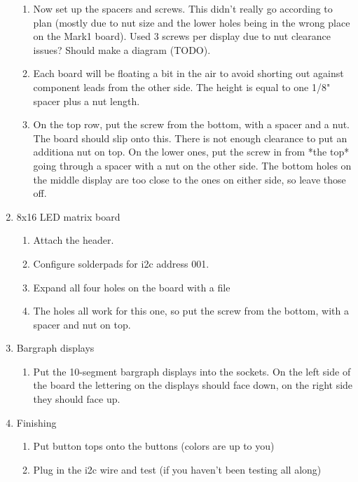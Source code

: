 \documentclass[11pt]{article}
\begin{document}
\begin{enumerate}
\begin{enumerate}
		\item Now set up the spacers and screws.  
			This didn't really go according
			to plan (mostly due to nut size and the lower holes being in the
			wrong place on the Mark1 board).
			Used 3 screws per display due to nut clearance issues?
			Should make a diagram (TODO).

		\item Each board will be floating a bit in the air to avoid shorting out
			against component leads from the other side.
			The height is equal to one 1/8" spacer plus a nut length.  

		\item On the top row, put the screw from the bottom, with a spacer and a nut.
			The board should slip onto this.
			There is not enough clearance to put an additiona nut on top.
			On the lower ones, put the screw in from *the top* going through 
			a spacer with a nut on the other side.
			The bottom holes on the middle display are too close to the ones
			on either side, so leave those off.

	\end{enumerate}

\item 8x16 LED matrix board
	\begin{enumerate}

	\item	Attach the header.
	\item   Configure solderpads for i2c address 001.
	\item   Expand all four holes on the board with a file
	\item   The holes all work for this one, so put the screw from the bottom,
		with a spacer and nut on top.
	\end{enumerate}


\item Bargraph displays
	\begin{enumerate}

	\item	Put the 10-segment bargraph displays into the sockets.
		On the left side of the board the lettering on the displays should
		face down, on the right side they should face up.
	\end{enumerate}

\item Finishing
	\begin{enumerate}

	\item	Put button tops onto the buttons (colors are up to you)

	\item	Plug in the i2c wire and test (if you haven't been testing all along)
	\end{enumerate}


\end{enumerate}
\end{document}
